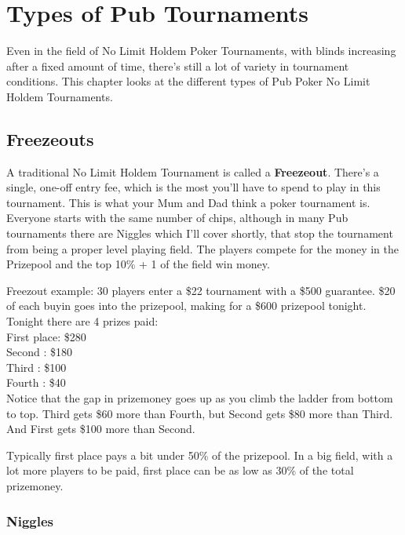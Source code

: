 \chapter{Types of Pub Tournaments}


Even in the field of No Limit Holdem Poker Tournaments,
with blinds increasing after a fixed amount of time, there's still a
lot of variety in tournament conditions. This chapter
looks at the different types of Pub Poker No Limit Holdem Tournaments.

\section{Freezeouts}

A traditional No Limit Holdem Tournament is called a \textbf{Freezeout}.
There's a single, one-off entry fee, which is the most you'll have to
spend to play in this tournament. This is what your Mum and Dad
think a poker tournament is. Everyone starts with the same number
of chips, although in many Pub tournaments there are Niggles which
I'll cover shortly, that stop the tournament from being a proper
level playing field. The players compete for the
money in the Prizepool and the top 10\% + 1 of the field win money.

Freezout example: 30 players enter a \$22 tournament with a \$500
guarantee. \$20 of each buyin goes into the prizepool, making for a \$600
prizepool tonight. Tonight there are 4 prizes paid: \\
First place: \$280 \\
Second     : \$180 \\
Third      : \$100 \\
Fourth     :  \$40  \\


Notice that the gap in prizemoney goes up as you climb the ladder
from bottom to top. Third gets \$60 more than Fourth, but Second gets
\$80 more than Third. And First gets \$100 more than Second.

Typically first place pays a bit under 50\% of the prizepool. In a
big field, with a lot more players to be paid, first place can
be as low as 30\% of the total prizemoney. 


\subsection{Niggles}

